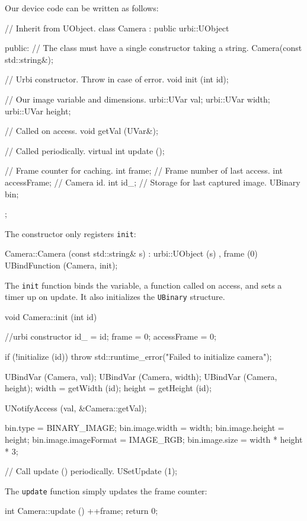 Our device code can be written as follows:
\begin{cxx}
// Inherit from UObject.
class Camera : public urbi::UObject
{
public:
  // The class must have a single constructor taking a string.
  Camera(const std::string&);

  // Urbi constructor. Throw in case of error.
  void init (int id);

  // Our image variable and dimensions.
  urbi::UVar val;
  urbi::UVar width;
  urbi::UVar height;

  // Called on access.
  void getVal (UVar&);

  // Called periodically.
  virtual int update ();

  // Frame counter for caching.
  int frame;
  // Frame number of last access.
  int accessFrame;
  // Camera id.
  int id_;
  // Storage for last captured image.
  UBinary bin;
};
\end{cxx}

The constructor only registers \lstinline{init}:

\begin{cxx}
Camera::Camera (const std::string& s)
  : urbi::UObject (s)
  , frame (0)
{
  UBindFunction (Camera, init);
}
\end{cxx}

The \lstinline{init} function binds the variable, a function called on
access, and sets a timer up on update. It also initializes the
\lstinline{UBinary} structure.

\begin{cxx}
void
Camera::init (int id)
{
  //urbi constructor
  id_ = id;
  frame = 0;
  accessFrame = 0;

  if (!initialize (id))
    throw std::runtime_error("Failed to initialize camera");

  UBindVar (Camera, val);
  UBindVar (Camera, width);
  UBindVar (Camera, height);
  width = getWidth (id);
  height = getHeight (id);

  UNotifyAccess (val, &Camera::getVal);

  bin.type = BINARY_IMAGE;
  bin.image.width = width;
  bin.image.height = height;
  bin.image.imageFormat = IMAGE_RGB;
  bin.image.size = width * height * 3;

  // Call update () periodically.
  USetUpdate (1);
}
\end{cxx}

The \lstinline{update} function simply updates the frame counter:

\begin{cxx}
int
Camera::update ()
{
  ++frame;
  return 0;
}
\end{cxx}

